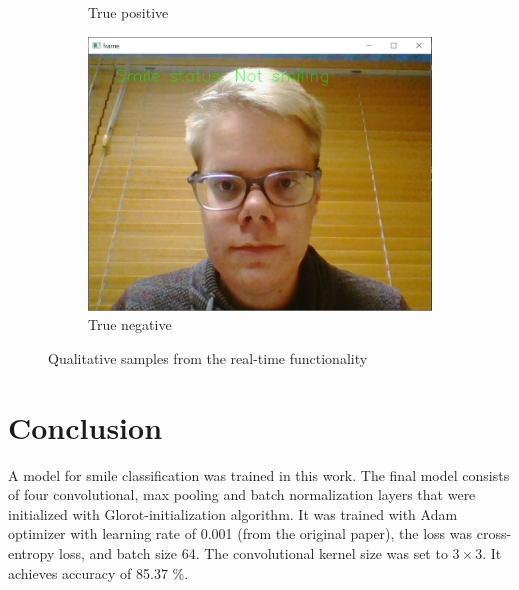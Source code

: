 \documentclass{article}
\begin{document}
\begin{figure}[t]
\begin{minipage}[t]{0.5\textwidth}
\begin{subfigure}[t]{0.5\linewidth}
      \caption{True positive}
    \end{subfigure}%
    \begin{subfigure}[t]{0.5\linewidth}\centering
      \includegraphics[width=0.5\linewidth]{figures/camera_example2.jpg}
      \caption{True negative}
    \end{subfigure}
    \caption{Qualitative samples from the real-time
      functionality}\label{fig:realtime}
  \end{minipage}
\end{figure}


\section{Conclusion}\label{sec:conclusion}
A model for smile classification was trained in this work. The final
model consists of four convolutional, max pooling and batch
normalization layers that were initialized with Glorot-initialization
algorithm. It was trained with Adam optimizer with learning rate of
0.001 (from the original paper), the loss was cross-entropy loss, and
batch size 64. The convolutional kernel size was set to $3 \times 3$.
It achieves accuracy of 85.37 \%.

\small




%

\vfill\pagebreak
\end{document}
